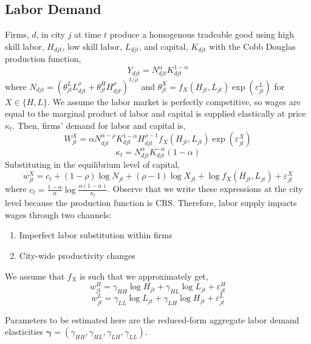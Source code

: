 \documentclass{article}
\begin{document}
\subsection{Labor Demand}
Firms, $d$, in city $j$ at time $t$ produce a homogenous tradeable good using high skill labor, $H_{djt}$, low skill labor, $L_{djt}$, and capital, $K_{djt}$ with the Cobb Douglas production function,
\begin{equation}\label{eq: production function}
    Y_{djt} = N_{djt}^\alpha K_{djt}^{1-\alpha}
\end{equation}
where $N_{djt}=(\theta_{jt}^L L_{djt}^\rho + \theta_{jt}^H H_{djt}^\rho)^{1/\rho}$ and $\theta_{jt}^X = f_X(H_{jt},L_{jt})\exp(\varepsilon_{jt}^L)$ for $X\in\{H,L\}$. We assume the labor market is perfectly competitive, so wages are equal to the marginal product of labor and capital is supplied elastically at price $\kappa_t$. Then, firms' demand for labor and capital is,
$$W_{jt}^X = \alpha N_{djt}^{\alpha-\rho} K_{djt}^{1-\alpha} H_{djt}^{\rho-1}f_X(H_{jt},L_{jt})\exp(\varepsilon_{jt}^X)$$
$$\kappa_t = N_{djt}^\alpha K_{djt}^{-\alpha}(1-\alpha)$$
Substituting in the equilibrium level of capital,
\begin{equation}
    w_{jt}^X = c_t + (1-\rho)\log N_{jt} + (\rho-1)\log X_{jt} + \log f_X(H_{jt},L_{jt}) + \varepsilon_{jt}^X
\end{equation}
where $c_t = \frac{1-\alpha}{\alpha} \log \frac{\alpha(1-\alpha)}{\kappa_t}$. Observe that we write these expressions at the city level because the production function is CRS. 
Therefore, labor supply impacts wages through two channels:
\begin{enumerate}
    \item Imperfect labor substitution within firms
    \item City-wide productivity changes
\end{enumerate}
We assume that $f_X$ is such that we approximately get,
$$w_{jt}^H = \gamma_{HH}\log H_{jt} + \gamma_{HL} \log L_{jt} + \varepsilon_{jt}^H$$
$$w_{jt}^L = \gamma_{LL}\log L_{jt} + \gamma_{LH} \log H_{jt} + \varepsilon_{jt}^L$$ %

Parameters to be estimated here are the reduced-form aggregate labor demand elasticities $\bm{\gamma} = (\gamma_{HH}, \gamma_{HL}, \gamma_{LH}, \gamma_{LL})$. 
\end{document}
